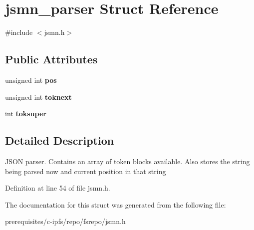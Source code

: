 \hypertarget{structjsmn__parser}{}\section{jsmn\+\_\+parser Struct Reference}
\label{structjsmn__parser}


{\ttfamily \#include $<$jsmn.\+h$>$}

\subsection*{Public Attributes}
\begin{DoxyCompactItemize}
\item 
\mbox{\label{structjsmn__parser_a3d0d6e48d3d5b24262f9e0c2241dc456}} 
unsigned int {\bfseries pos}
\item 
\mbox{\label{structjsmn__parser_af640efd7d154218124a964b65f114bff}} 
unsigned int {\bfseries toknext}
\item 
\mbox{\label{structjsmn__parser_af11fcec48d9f1298909777a12f1d1e39}} 
int {\bfseries toksuper}
\end{DoxyCompactItemize}


\subsection{Detailed Description}
J\+S\+ON parser. Contains an array of token blocks available. Also stores the string being parsed now and current position in that string 

Definition at line 54 of file jsmn.\+h.



The documentation for this struct was generated from the following file\+:\begin{DoxyCompactItemize}
\item 
prerequisites/c-\/ipfs/repo/fsrepo/jsmn.\+h\end{DoxyCompactItemize}
